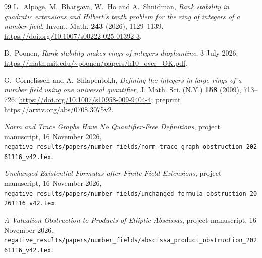 \documentclass[11pt,a4paper]{article}
\theoremstyle{definition}
\begin{document}
\begin{thebibliography}{99}
L.~Alp\"oge, M.~Bhargava, W.~Ho and A.~Shnidman,
\emph{Rank stability in quadratic extensions and Hilbert's tenth
problem for the ring of integers of a number field},
Invent. Math. \textbf{243} (2026), 1129--1139.
\url{https://doi.org/10.1007/s00222-025-01392-3}.

B.~Poonen, \emph{Rank stability makes rings of integers diophantine},
3 July 2026.
\url{https://math.mit.edu/~poonen/papers/h10_over_OK.pdf}.

G.~Cornelissen and A.~Shlapentokh,
\emph{Defining the integers in large rings of a number field using
one universal quantifier},
J. Math. Sci. (N.Y.) \textbf{158} (2009), 713--726.
\url{https://doi.org/10.1007/s10958-009-9404-4};
preprint \url{https://arxiv.org/abs/0708.3075v2}.

\emph{Norm and Trace Graphs Have No Quantifier-Free Definitions},
project manuscript, 16 November 2026,
\nolinkurl{negative_results/papers/number_fields/norm_trace_graph_obstruction_20261116_v42.tex}.

\emph{Unchanged Existential Formulas after Finite Field Extensions},
project manuscript, 16 November 2026,
\nolinkurl{negative_results/papers/number_fields/unchanged_formula_obstruction_20261116_v42.tex}.

\emph{A Valuation Obstruction to Products of Elliptic Abscissas},
project manuscript, 16 November 2026,
\nolinkurl{negative_results/papers/number_fields/abscissa_product_obstruction_20261116_v42.tex}.
\end{thebibliography}
\end{document}
